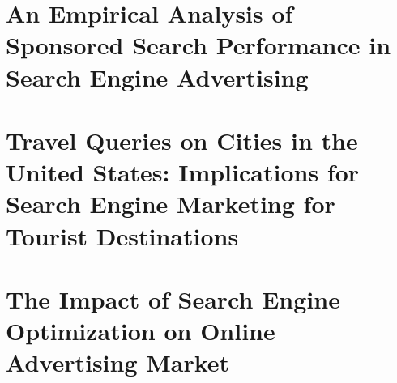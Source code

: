 \documentclass[11pt]{article}
\begin{document}
\section{An Empirical Analysis of Sponsored Search Performance in Search Engine Advertising}

\newpage

\section{Travel Queries on Cities in the United States: Implications for Search Engine Marketing for Tourist Destinations}

\newpage

\section{The Impact of Search Engine Optimization on Online Advertising Market}

\end{document}
